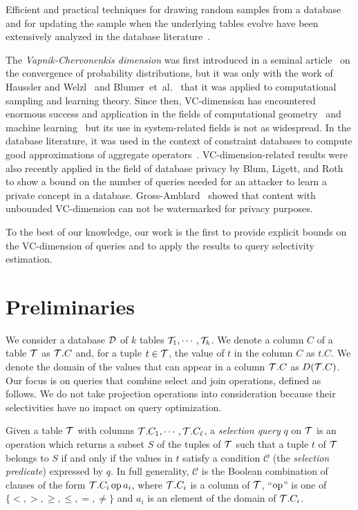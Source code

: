 Efficient and practical techniques for drawing random samples from a database
and for updating  the sample when the underlying tables evolve have been extensively
analyzed in the database
literature~\citep{BrownH06,GemullaLH06,GemullaLH07,HaasK04,JermainePA04}.

The {\em Vapnik-Chervonenkis dimension} was first introduced in a seminal
article~\citep{VapnikC71} on the convergence of probability distributions, but it
was only with the work of Haussler and Welzl~\citeyearpar{HausslerW86} and 
Blumer~et~al.~\citeyearpar{BlumerEHW89} that it was applied to computational sampling
and learning theory. Since then, VC-dimension has encountered
enormous success and application in the fields of computational
geometry~\citep{Chazelle00,Matousek02} and machine learning~\citep{AnthonyB99} but
its use in system-related fields is not as widespread. In the database
literature, it was used in the context of constraint databases to compute good
approximations of aggregate operators~\citep{BenediktL02}. VC-dimension-related
results were also recently applied in the field of database privacy by Blum,
Ligett, and Roth~\citeyearpar{BlumLR08} to show a bound on the number of queries needed
for an attacker to learn a private concept in a database.
Gross-Amblard~\citeyearpar{Gross11} showed that content with unbounded VC-dimension can
not be watermarked for privacy purposes. 

To the best of our knowledge, our work is the first to provide explicit bounds
on the VC-dimension of queries and to apply the results to query selectivity
estimation.

\section{Preliminaries}\label{sec:prelim}
We consider a database ${\cal D}$ of $k$ tables ${\cal T}_1,\cdots,{\cal T}_k$. We denote a
column $C$ of a table ${\cal T}$ as ${\cal T}.C$ and, for a tuple $t\in{\cal T}$, the value
of $t$ in the column $C$ as $t.C$. We denote the domain of the values that can
appear in a column ${\cal T}.C$ as $D({\cal T}.C)$. Our focus is on queries that combine
select and join operations, defined as follows. We do not take projection
operations into consideration because their selectivities have no impact on
query optimization.

\begin{definition}\label{def:selectquery}
  Given a table ${\cal T}$ with columns ${\cal T}.C_1,\cdots,{\cal T}.C_\ell$, a
  \emph{selection query} $q$ on ${\cal T}$ is an operation which returns a subset
  $S$ of the tuples of ${\cal T}$ such that a tuple $t$ of ${\cal T}$ belongs to $S$ if
  and only if the values in $t$ satisfy a condition $\mathcal{C}$
  (the \emph{selection predicate}) expressed by $q$. In full
  generality, $\mathcal{C}$ is the Boolean combination of clauses of the form
  ${\cal T}.C_i \operatorname{op} a_i$, where ${\cal T}.C_i$ is a column of ${\cal T}$, ``$\operatorname{op}$'' is one
  of $\{<,>,\ge,\le,=,\neq\}$ and $a_i$ is an element of the domain of
  ${\cal T}.C_i$.
\end{definition}


